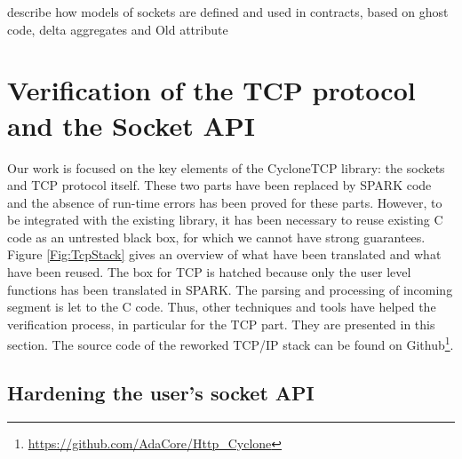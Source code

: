 \documentclass[runningheads]{llncs}
\begin{document}
describe how models of sockets are defined and used in contracts, based on
ghost code, delta aggregates and Old attribute


\section{Verification of the TCP protocol and the Socket API}

    Our work is focused on the key elements of the CycloneTCP library: the sockets and TCP protocol itself.
    These two parts have been replaced by SPARK code and the absence of run-time errors has been proved for
    these parts.
    However, to be integrated with the existing library, it has been necessary to reuse existing C code
    as an untrested black box, for which we cannot have strong guarantees. Figure \ref{Fig:TcpStack} gives an overview of
    what have been translated and what have been reused. The box for TCP is hatched because only the user level functions
    has been translated in SPARK. The parsing and processing of incoming segment is let to the C code.
    Thus, other techniques and tools have helped the verification process, in particular for the TCP part. They are presented in this section.
    The source code of the reworked TCP/IP stack can be found on Github\footnote{\url{https://github.com/AdaCore/Http_Cyclone}}.

\subsection{Hardening the user's socket API}
\end{document}
